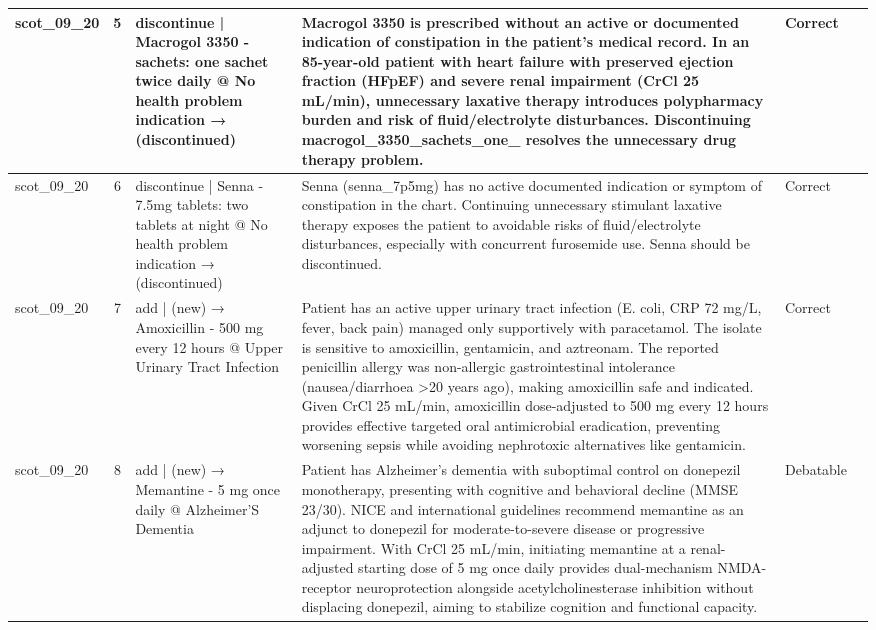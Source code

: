 \begin{longtable}{|p{1.45cm}|c|p{3.3cm}|p{6.5cm}|p{1.55cm}|p{2.3cm}|}
\hline
scot\_09\_20 & 5 & discontinue | Macrogol 3350 - sachets: one sachet twice daily @ No health problem indication → (discontinued) & Macrogol 3350 is prescribed without an active or documented indication of constipation in the patient's medical record. In an 85-year-old patient with heart failure with preserved ejection fraction (HFpEF) and severe renal impairment (CrCl 25 mL/min), unnecessary laxative therapy introduces polypharmacy burden and risk of fluid/electrolyte disturbances. Discontinuing macrogol\_3350\_sachets\_one\_ resolves the unnecessary drug therapy problem. & Correct &  \\
\hline
scot\_09\_20 & 6 & discontinue | Senna - 7.5mg tablets: two tablets at night @ No health problem indication → (discontinued) & Senna (senna\_7p5mg) has no active documented indication or symptom of constipation in the chart. Continuing unnecessary stimulant laxative therapy exposes the patient to avoidable risks of fluid/electrolyte disturbances, especially with concurrent furosemide use. Senna should be discontinued. & Correct &  \\
\hline
scot\_09\_20 & 7 & add | (new) → Amoxicillin - 500 mg every 12 hours @ Upper Urinary Tract Infection & Patient has an active upper urinary tract infection (E. coli, CRP 72 mg/L, fever, back pain) managed only supportively with paracetamol. The isolate is sensitive to amoxicillin, gentamicin, and aztreonam. The reported penicillin allergy was non-allergic gastrointestinal intolerance (nausea/diarrhoea >20 years ago), making amoxicillin safe and indicated. Given CrCl 25 mL/min, amoxicillin dose-adjusted to 500 mg every 12 hours provides effective targeted oral antimicrobial eradication, preventing worsening sepsis while avoiding nephrotoxic alternatives like gentamicin. & Correct &  \\
\hline
scot\_09\_20 & 8 & add | (new) → Memantine - 5 mg once daily @ Alzheimer’S Dementia & Patient has Alzheimer's dementia with suboptimal control on donepezil monotherapy, presenting with cognitive and behavioral decline (MMSE 23/30). NICE and international guidelines recommend memantine as an adjunct to donepezil for moderate-to-severe disease or progressive impairment. With CrCl 25 mL/min, initiating memantine at a renal-adjusted starting dose of 5 mg once daily provides dual-mechanism NMDA-receptor neuroprotection alongside acetylcholinesterase inhibition without displacing donepezil, aiming to stabilize cognition and functional capacity. & Debatable &  \\
\hline

\end{longtable}
